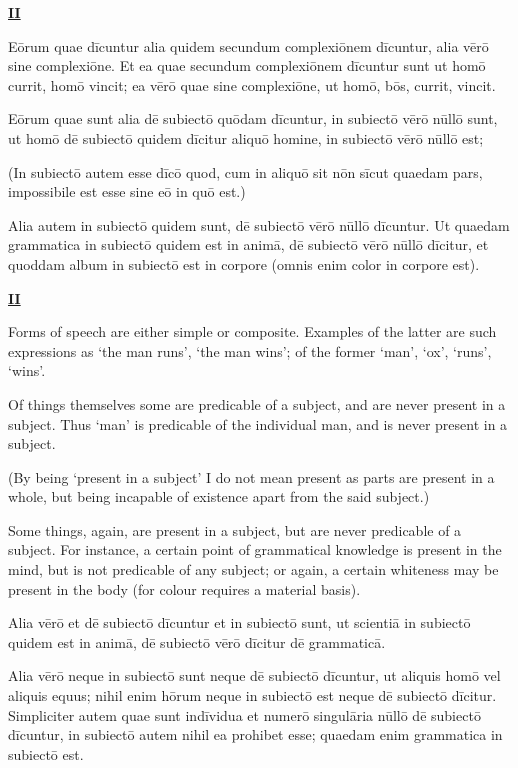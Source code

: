 \documentclass[14pt,twoside]{extbook}
\newcommand{\mktitle}[1]{%
    {\begin{center}\small\textsc{\bfseries\underline{#1}}\end{center}}}
\begin{document}
\newpage

\mktitle{II}

Eōrum quae dīcuntur alia quidem secundum complexiōnem dīcuntur, alia
vērō sine complexiōne. Et ea quae secundum complexiōnem dīcuntur sunt
ut homō currit, homō vincit; ea vērō quae sine complexiōne, ut homō,
bōs, currit, vincit.

Eōrum quae sunt alia dē subiectō quōdam dīcuntur, in subiectō vērō
nūllō sunt, ut homō dē subiectō quidem dīcitur aliquō homine, in
subiectō vērō nūllō est; 

(In subiectō autem esse dīcō quod, cum in
aliquō sit nōn sīcut quaedam pars, impossibile est esse sine eō in quō
est.)

Alia autem in subiectō quidem sunt, dē
subiectō vērō nūllō dīcuntur.  Ut quaedam grammatica in subiectō quidem est in animā, dē
subiectō vērō nūllō dīcitur, et quoddam album in subiectō est in
corpore (omnis enim color in corpore est).\newpage

\mktitle{II}

Forms of speech are either simple or composite. Examples of the latter are such expressions as `the man runs', `the man wins'; of the former `man', `ox', `runs', `wins'.

Of things themselves some are predicable of a subject, and are never present in a subject. Thus `man' is predicable of the individual man, and is never present in a subject.

(By being `present in a subject' I do not mean present as parts are present in a whole, but being incapable of existence apart from the said subject.)

Some things, again, are present in a subject, but are never predicable of a subject. For instance, a certain point of grammatical knowledge is present in the mind, but is not predicable of any subject; or again, a certain whiteness may be present in the body (for colour requires a material basis).\newpage

Alia vērō et dē subiectō
dīcuntur et in subiectō sunt, ut scientiā in subiectō quidem est in
animā, dē subiectō vērō dīcitur dē grammaticā. 

Alia vērō neque in
subiectō sunt neque dē subiectō dīcuntur, ut aliquis homō vel aliquis
equus; nihil enim hōrum neque in subiectō est neque dē subiectō dīcitur. Simpliciter autem quae sunt indīvidua et numerō singulāria
nūllō dē subiectō dīcuntur, in subiectō autem nihil ea prohibet esse;
quaedam enim grammatica in subiectō est.\newpage
\end{document}
